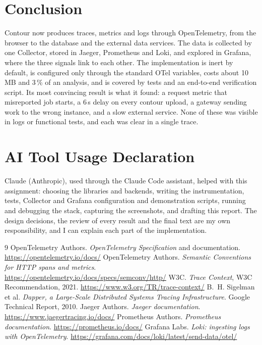 \documentclass[11pt,a4paper]{article}
\begin{document}
\section{Conclusion}
Contour now produces traces, metrics and logs through OpenTelemetry, from the browser to the
database and the external data services. The data is collected by one Collector, stored in
Jaeger, Prometheus and Loki, and explored in Grafana, where the three signals link to each other.
The implementation is inert by default, is configured only through the standard OTel variables,
costs about 10\,MB and 3\,\% of an analysis, and is covered by tests and an end-to-end
verification script. Its most convincing result is what it found: a request metric that
misreported job starts, a 6\,s delay on every contour upload, a gateway sending work to the
wrong instance, and a slow external service. None of these was visible in logs or functional
tests, and each was clear in a single trace.

\section{AI Tool Usage Declaration}
Claude (Anthropic), used through the Claude Code assistant, helped with this assignment: choosing
the libraries and backends, writing the instrumentation, tests, Collector and Grafana
configuration and demonstration scripts, running and debugging the stack, capturing the
screenshots, and drafting this report. The design decisions, the review of every result and the
final text are my own responsibility, and I can explain each part of the implementation.

\begin{thebibliography}{9}
 OpenTelemetry Authors. \emph{OpenTelemetry Specification} and documentation.
  \url{https://opentelemetry.io/docs/}
 OpenTelemetry Authors. \emph{Semantic Conventions for HTTP spans and metrics}.
  \url{https://opentelemetry.io/docs/specs/semconv/http/}
 W3C. \emph{Trace Context}, W3C Recommendation, 2021.
  \url{https://www.w3.org/TR/trace-context/}
 B.~H. Sigelman et al. \emph{Dapper, a Large-Scale Distributed Systems Tracing
  Infrastructure}. Google Technical Report, 2010.
 Jaeger Authors. \emph{Jaeger documentation}. \url{https://www.jaegertracing.io/docs/}
 Prometheus Authors. \emph{Prometheus documentation}. \url{https://prometheus.io/docs/}
 Grafana Labs. \emph{Loki: ingesting logs with OpenTelemetry}.
  \url{https://grafana.com/docs/loki/latest/send-data/otel/}
\end{thebibliography}
\end{document}
